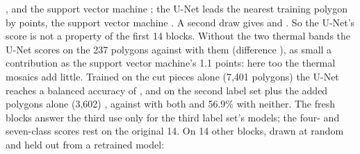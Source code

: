 , and the support vector machine ; the U-Net leads the
nearest training polygon by  points, the support vector machine
. A second draw gives  and
. So the U-Net's score is not a property of the first 14 blocks.
Without the two thermal bands the U-Net scores  on the 237 polygons against
 with them (difference ),
as small a contribution as the support vector machine's 1.1 points: here too the thermal mosaics add little.
Trained on the cut pieces alone (7,401 polygons) the U-Net reaches a balanced accuracy of
, and on the second label set plus the added polygons alone (3,602)
, against  with both and 56.9\% with
neither. %
The fresh blocks answer the third use only for the third label set's models; the four- and seven-class scores rest
on the original 14.
On 14 other blocks, drawn at random and held out from a retrained model: 

